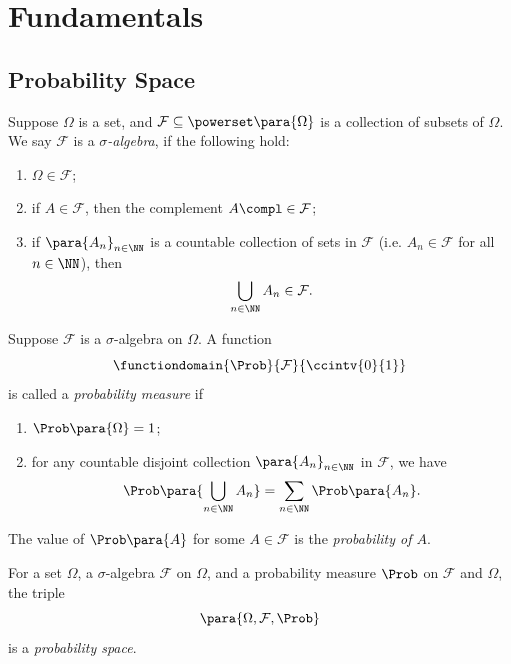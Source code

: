 \section{Fundamentals}

\subsection{Probability Space}
\begin{definition}
    \label{def:sigma-algebra}%
    Suppose \(\Omega\) is a set, and \(\mathcal{F} \subseteq \powerset\para{\Omega}\) is a collection of subsets of \(\Omega\). We say \(\mathcal{F}\) is a \emph{\(\sigma\)-algebra}, if the following hold:
    \begin{enumerate}
        \item \(\Omega \in \mathcal{F}\);
        \item if \(A \in \mathcal{F}\), then the complement \(A\compl \in \mathcal{F}\);
        \item if \(\para{A_n}_{n \in \NN}\) is a countable collection of sets in \(\mathcal{F}\) (i.e. \(A_n \in \mathcal{F}\) for all \(n \in \NN\)), then
        \[
            \bigcup_{n \in \NN} A_n \in \mathcal{F}.
        \]
    \end{enumerate}
\end{definition}

\begin{definition}
    \label{def:probability-measure}%
    Suppose \(\mathcal{F}\) is a \(\sigma\)-algebra on \(\Omega\). A function
    \[
        \functiondomain{\Prob}{\mathcal{F}}{\ccintv{0}{1}}
    \]
    is called a \emph{probability measure} if
    \begin{enumerate}
        \item \(\Prob\para{\Omega} = 1\);
        \item for any countable disjoint collection \(\para{A_n}_{n \in \NN}\) in \(\mathcal{F}\), we have
        \[
            \Prob\para{\bigcup_{n \in \NN} A_n} = \sum_{n \in \NN} \Prob\para{A_n}.
        \]
    \end{enumerate}

    The value of \(\Prob\para{A}\) for some \(A \in \mathcal{F}\) is the \emph{probability of \(A\)}.
\end{definition}

\begin{definition}
    \label{def:probability-space}%
    For a set \(\Omega\), a \(\sigma\)-algebra \(\mathcal{F}\) on \(\Omega\), and a probability measure \(\Prob\) on \(\mathcal{F}\) and \(\Omega\), the triple
    \[
        \para{\Omega, \mathcal{F}, \Prob}
    \]
    is a \emph{probability space}.
\end{definition}

